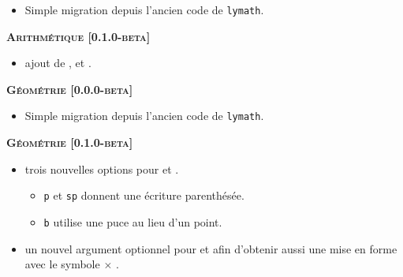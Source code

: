 \documentclass[12pt,a4paper]{book}
\begin{document}
\begin{description}
\begin{itemize}[itemsep=.5em]
    \item Simple migration depuis l'ancien code de \verb+lymath+.
\end{itemize}


\begin{center}
    \textbf{\textsc{Arithmétique [0.1.0-beta]}}
\end{center}

\begin{itemize}[itemsep=.5em]
    \item {} ajout de ,  et .
\end{itemize}


\separation




\begin{center}
    \textbf{\textsc{Géométrie [0.0.0-beta]}}
\end{center}

\begin{itemize}[itemsep=.5em]
    \item Simple migration depuis l'ancien code de \verb+lymath+.
\end{itemize}


\begin{center}
    \textbf{\textsc{Géométrie [0.1.0-beta]}}
\end{center}

\begin{itemize}[itemsep=.5em]
    \item {}
          trois nouvelles options pour  et .
    \begin{itemize}[itemsep=.5em]
        \item \verb+p+ et \verb+sp+ donnent une écriture parenthésée.

        \item \verb+b+ utilise une puce au lieu d'un point.
    \end{itemize}


	


    \item {}
          un nouvel argument optionnel pour  et  afin d'obtenir aussi une mise en forme avec le symbole $\times$ .



\end{itemize}
\end{description}
\end{document}
